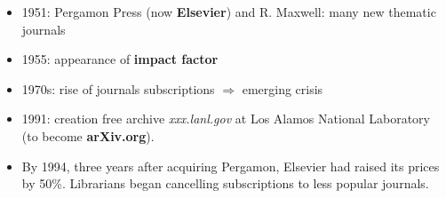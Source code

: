 \documentclass[10pt,compress,serif,aspectratio=169]{beamer}
\begin{document}
 
 \begin{frame}[t]%
 \vskip1cm%
\begin{itemize}

 \item 1951: Pergamon Press (now \textbf{Elsevier}) and R. Maxwell: many new thematic journals
 \item 1955: appearance of \textbf{impact factor}
 \item 1970s: rise of journals subscriptions $\Rightarrow$ emerging crisis
 \item 1991: creation free archive \textit{xxx.lanl.gov} at Los Alamos National Laboratory (to become \textbf{arXiv.org}).
\item By 1994, three years after acquiring Pergamon, Elsevier had raised its prices by 50\%. Librarians began cancelling subscriptions to less popular journals.
\end{itemize}
\end{frame}

 
\end{document}
